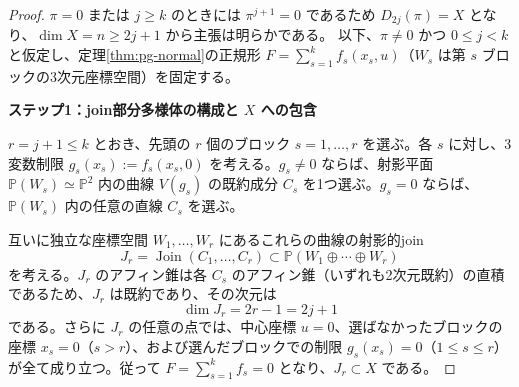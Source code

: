 \begin{proof}
$\pi=0$ または $j\ge k$ のときには $\pi^{j+1}=0$ であるため $D_{2j}(\pi)=X$ となり、$\dim X=n\ge 2j+1$ から主張は明らかである。
以下、$\pi\ne0$ かつ $0\le j<k$ と仮定し、定理\ref{thm:pg-normal}の正規形 $F=\sum_{s=1}^k f_s(x_s,u)$（$W_s$ は第 $s$ ブロックの3次元座標空間）を固定する。

\par\medskip\noindent\textbf{ステップ1：join部分多様体の構成と $X$ への包含}\par\nobreak\smallskip
$r=j+1\le k$ とおき、先頭の $r$ 個のブロック $s=1,\ldots,r$ を選ぶ。各 $s$ に対し、3変数制限 $g_s(x_s):=f_s(x_s,0)$ を考える。$g_s\neq 0$ ならば、射影平面 $\mathbb P(W_s)\simeq\mathbb P^2$ 内の曲線 $V(g_s)$ の既約成分 $C_s$ を1つ選ぶ。$g_s=0$ ならば、$\mathbb P(W_s)$ 内の任意の直線 $C_s$ を選ぶ。

互いに独立な座標空間 $W_1,\ldots,W_r$ にあるこれらの曲線の射影的join
\begin{equation}
  J_r=\operatorname{Join}(C_1,\ldots,C_r)
  \subset\mathbb P(W_1\oplus\cdots\oplus W_r)
\end{equation}
を考える。$J_r$ のアフィン錐は各 $C_s$ のアフィン錐（いずれも2次元既約）の直積であるため、$J_r$ は既約であり、その次元は
\[
  \dim J_r = 2r - 1 = 2j + 1
\]
である。さらに $J_r$ の任意の点では、中心座標 $u=0$、選ばなかったブロックの座標 $x_s=0$（$s>r$）、および選んだブロックでの制限 $g_s(x_s)=0$（$1\le s\le r$）が全て成り立つ。従って $F=\sum_{s=1}^k f_s=0$ となり、$J_r\subset X$ である。


\end{proof}
